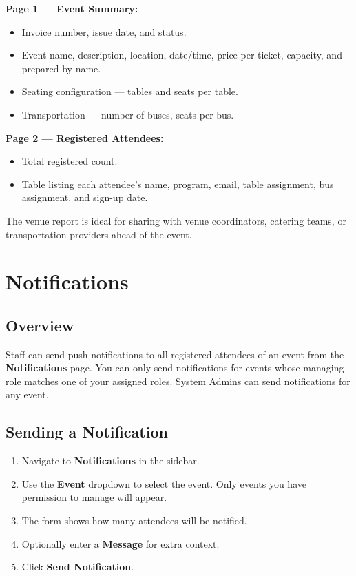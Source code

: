 \documentclass[12pt, twoside]{report}
\newcommand{\uielem}[1]{\textbf{#1}}
\begin{document}
\textbf{Page 1 --- Event Summary:}
\begin{itemize}
  \item Invoice number, issue date, and status.
  \item Event name, description, location, date/time, price per ticket,
        capacity, and prepared-by name.
  \item Seating configuration --- tables and seats per table.
  \item Transportation --- number of buses, seats per bus.
\end{itemize}

\textbf{Page 2 --- Registered Attendees:}
\begin{itemize}
  \item Total registered count.
  \item Table listing each attendee's name, program, email, table
        assignment, bus assignment, and sign-up date.
\end{itemize}

\begin{tipbox}
The venue report is ideal for sharing with venue coordinators, catering
teams, or transportation providers ahead of the event.
\end{tipbox}



\chapter{Notifications}


\section{Overview}

Staff can send push notifications to all registered attendees of an event
from the \uielem{Notifications} page. You can only send notifications for
events whose managing role matches one of your assigned roles. System Admins
can send notifications for any event.

\section{Sending a Notification}

\begin{enumerate}
  \item Navigate to \uielem{Notifications} in the sidebar.
  \item Use the \uielem{Event} dropdown to select the event. Only events
        you have permission to manage will appear.
  \item The form shows how many attendees will be notified.
  \item Optionally enter a \uielem{Message} for extra context.
  \item Click \uielem{Send Notification}.
\end{enumerate}
\end{document}
